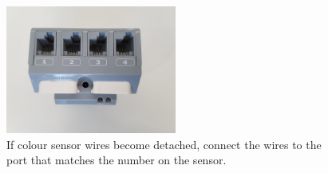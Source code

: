 \documentclass[onecolumn]{IEEEtran}
\begin{document}
\begin{figure}[H]
    \begin{center}
    \includegraphics[width=0.5\textwidth]{colour.jpg}
    \caption{If colour sensor wires become detached, connect the wires to the port that matches the number on the sensor.}
    \label{fig: figure}
    \end{center}
\end{figure}
\end{document}
